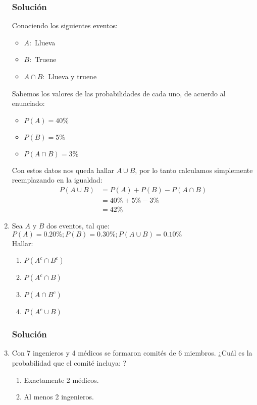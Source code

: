 \begin{enumerate}
\subsubsection{Solución}
Conociendo los siguientes eventos:
\begin{itemize}
\item $A:$ Llueva
\item $B:$ Truene
\item $A\cap B:$ Llueva y truene
\end{itemize}
Sabemos los valores de las probabilidades de cada uno, de acuerdo al enunciado:
\begin{itemize}
\item $P(A)=40\%$
\item $P(B)=5\%$
\item $P(A\cap B)=3\%$
\end{itemize}
Con estos datos nos queda hallar $A\cup B$, por lo tanto calculamos simplemente reemplazando en la igualdad:
\begin{align*}
 P(A\cup B) &= P(A)+P(B)-P(A\cap B)\\
 	      &= 40\% + 5\% - 3\%    \\
 	      	&= 42\%
\end{align*}
\item Sea $A$ y $B$ dos eventos, tal que: $P(A)=0.20\% ; P(B)=0.30\%;P(A\cup B)=0.10\%$ \\ Hallar:
\begin{enumerate}
\item $P(A^c\cap B^c)$
\item $P(A^c\cap B)$
\item $P(A\cap B^c)$
\item $P(A^c\cup B)$
\end{enumerate}


\subsubsection{Solución}
\item Con 7 ingenieros y 4 médicos se formaron comités de 6 miembros. ¿Cuál es la probabilidad que el comité incluya: ?
\begin{enumerate}
\item Exactamente 2 médicos.
\item Al menos 2 ingenieros.
\end{enumerate}

\end{enumerate}
